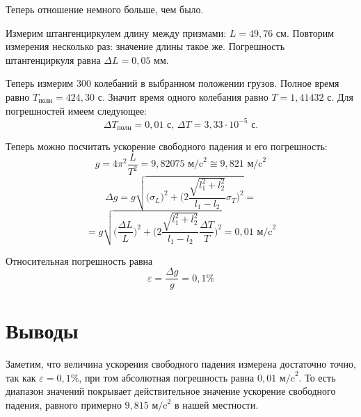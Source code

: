 \documentclass[a4paper, 12pt]{article} %
\begin{document}
Теперь отношение немного больше, чем было.

Измерим штангенциркулем длину между призмами: $L = 49,76$ см. Повторим измерения несколько раз: значение длины такое же. Погрешность штангенциркуля равна $\Delta L = 0,05$ мм.

Теперь измерим $300$ колебаний в выбранном положении грузов. Полное время равно $T_{\text{полн}} = 424,30$ с. Значит время одного колебания равно $T = 1,41432$ с. Для погрешностей имеем следующее:
\[ \Delta T_{\text{полн}} = 0,01 \text{ с, } \Delta T = 3,33 \cdot 10^{-5} \text{ с.} \]

Теперь можно посчитать ускорение свободного падения и его погрешность:
\[g = 4\pi^2\frac{L}{T^2} = 9,82075 \text{ м/c}^2\cong 9,821 \text{ м/c}^2\]
\[\Delta g = g \sqrt{\Big( \sigma_{L} \Big)^2 + \Big( 2\frac{\sqrt{l_1^2 + l_2^2}}{l_1 - l_2}\sigma_T \Big)^2} = \]
\[= g \sqrt{\Big( \frac{\Delta L} {L} \Big)^2 + \Big( 2\frac{\sqrt{l_1^2 + l_2^2}}{l_1 - l_2}\frac{\Delta T} {T}\Big)^2} = 0,01 \text{ м/c}^2\]

Относительная погрешность равна
\[\varepsilon = \frac{\Delta g}{g} = 0,1\%\]

\section{Выводы}

Заметим, что величина ускорения свободного падения измерена достаточно точно, так как $\varepsilon = 0,1\%$, при том абсолютная погрешность равна $0,01 \text{ м/c}^2$. То есть диапазон значений покрывает действительное значение ускорение свободного падения, равного примерно $9,815 \text{ м/c}^2$ в нашей местности. 
\end{document}
